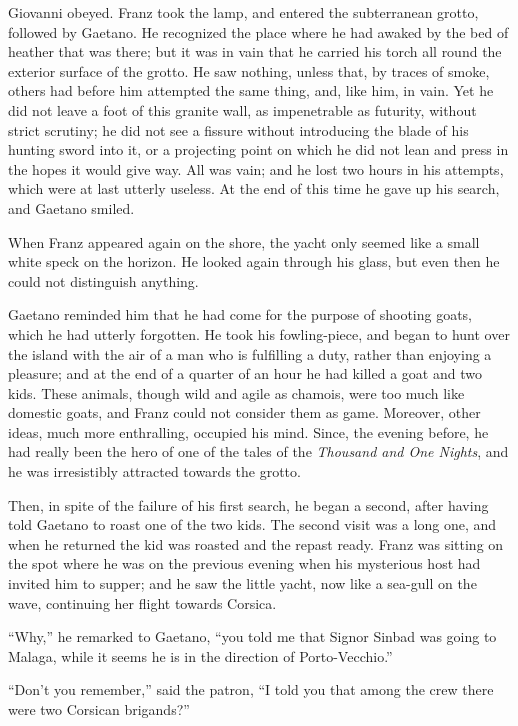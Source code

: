 Giovanni obeyed. Franz took the lamp, and entered the subterranean
grotto, followed by Gaetano. He recognized the place where he had
awaked by the bed of heather that was there; but it was in vain that he
carried his torch all round the exterior surface of the grotto. He saw
nothing, unless that, by traces of smoke, others had before him
attempted the same thing, and, like him, in vain. Yet he did not leave
a foot of this granite wall, as impenetrable as futurity, without
strict scrutiny; he did not see a fissure without introducing the blade
of his hunting sword into it, or a projecting point on which he did not
lean and press in the hopes it would give way. All was vain; and he
lost two hours in his attempts, which were at last utterly useless. At
the end of this time he gave up his search, and Gaetano smiled.

When Franz appeared again on the shore, the yacht only seemed like a
small white speck on the horizon. He looked again through his glass,
but even then he could not distinguish anything.

Gaetano reminded him that he had come for the purpose of shooting
goats, which he had utterly forgotten. He took his fowling-piece, and
began to hunt over the island with the air of a man who is fulfilling a
duty, rather than enjoying a pleasure; and at the end of a quarter of
an hour he had killed a goat and two kids. These animals, though wild
and agile as chamois, were too much like domestic goats, and Franz
could not consider them as game. Moreover, other ideas, much more
enthralling, occupied his mind. Since, the evening before, he had
really been the hero of one of the tales of the \textit{Thousand and One
Nights}, and he was irresistibly attracted towards the grotto.

Then, in spite of the failure of his first search, he began a second,
after having told Gaetano to roast one of the two kids. The second
visit was a long one, and when he returned the kid was roasted and the
repast ready. Franz was sitting on the spot where he was on the
previous evening when his mysterious host had invited him to supper;
and he saw the little yacht, now like a sea-gull on the wave,
continuing her flight towards Corsica.

“Why,” he remarked to Gaetano, “you told me that Signor Sinbad was
going to Malaga, while it seems he is in the direction of
Porto-Vecchio.”

“Don’t you remember,” said the patron, “I told you that among the crew
there were two Corsican brigands?”

